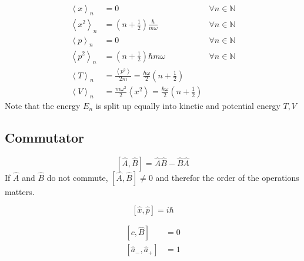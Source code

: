 \noindent\begin{align*}
    \left\langle x \right\rangle _n   & = 0                                                                                                    & \forall n \in \mathbb{N} \\
    \left\langle x^2 \right\rangle _n & = \left(n+\frac{1}{2}\right)\frac{\hbar}{m\omega}                                                      & \forall n \in \mathbb{N} \\
    \left\langle p \right\rangle _n   & = 0                                                                                                    & \forall n \in \mathbb{N} \\
    \left\langle p^2 \right\rangle _n & = \left(n+\frac{1}{2}\right)\hbar m\omega                                                              & \forall n \in \mathbb{N} \\
    \left\langle T \right\rangle _n   & = \frac{\left\langle p^2 \right\rangle}{2m} =  \frac{\hbar \omega}{2}\left(n+\frac{1}{2}\right)                                   \\
    \left\langle V \right\rangle _n   & = \frac{m\omega^2}{2}\left\langle x^2 \right\rangle = \frac{\hbar \omega}{2}\left(n+\frac{1}{2}\right)
\end{align*}
Note that the energy $E_n$ is split up equally into kinetic and potential energy $T,V$

\subsection{Commutator}\label{comm}
\noindent\begin{equation*}
    \left[\widehat{A},\widehat{B}\right] = \widehat{A}\widehat{B} - \widehat{B}\widehat{A}
\end{equation*}
If $\widehat{A}$ and $\widehat{B}$ do not commute, $\left[\widehat{A},\widehat{B}\right] \neq 0$ and therefor the order of the operations matters.

\newpar{}


\begin{equation*}
    \left[\hat{x},\hat{p}\right] = i\hbar
\end{equation*}

\noindent\begin{align*}
    \left[c,\hat B\right]                & =0  \\
    \left[\hat{a}_{-},\hat{a}_{+}\right] & = 1
\end{align*}


